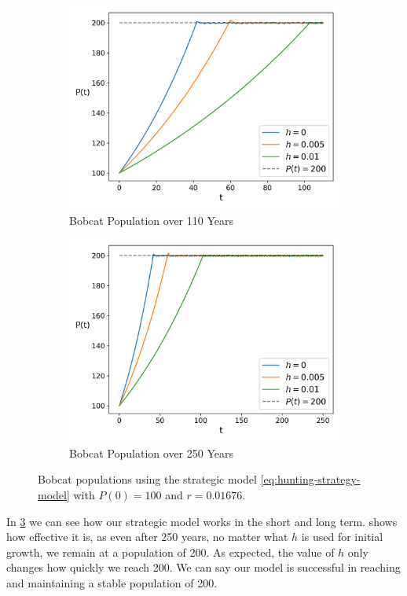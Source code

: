 \documentclass{article}
\begin{document}
\begin{figure}[h]
    \centering
    \begin{subfigure}{.5\textwidth}
        \centering
        \includegraphics[width=.95\linewidth]{./hunting_strategy/strategic_model_short_term.png}
        \caption{Bobcat Population over 110 Years}
        \label{fig:hunting-strategy-model-short-term}
    \end{subfigure}%
    \begin{subfigure}{.5\textwidth}
        \centering
        \includegraphics[width=.95\linewidth]{./hunting_strategy/strategic_model_long_term.png}
        \caption{Bobcat Population over 250 Years}
        \label{fig:hunting-strategy-model-long-term}
    \end{subfigure}
    \caption{Bobcat populations using the strategic model \cref{eq:hunting-strategy-model} with $P(0) = 100$ and $r = 0.01676$.}
    \label{fig:5}
\end{figure}

In \cref{fig:5} we can see how our strategic model works in the short and long term.  shows how effective it is, as even after 250 years, no matter what $h$ is used for initial growth, we remain at a population of 200. As expected, the value of $h$ only changes how quickly we reach 200. We can say our model is successful in reaching and maintaining a stable population of 200.
\end{document}
